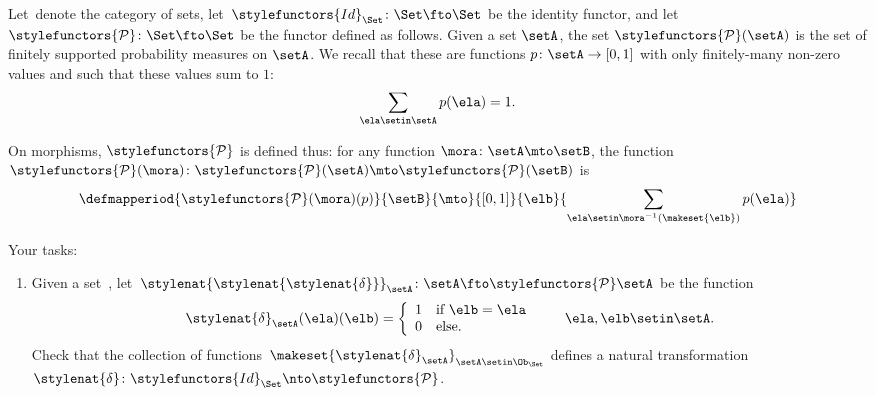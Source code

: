\begin{gradedexercise}
    \label{ex:FinProbMonad}

    Let~\Set denote the category of sets, let~$\stylefunctors{Id}_\Set \colon \Set \fto \Set$ be the identity functor, and let~$\stylefunctors{\mathcal{P}} \colon \Set \fto \Set$ be the functor defined as follows.
    Given a set $\setA$, the set $\stylefunctors{\mathcal{P}}(\setA)$ is the set of finitely supported probability measures on $\setA$.
    We recall that these are functions $p \colon \setA \to [0,1]$ with only finitely-many non-zero values and such that these values sum to $1$:
    \begin{equation}
        \sum_{\ela \setin \setA} p(\ela) = 1.
    \end{equation}

    On morphisms, $\stylefunctors{\mathcal{P}}$ is defined thus: for any function $\mora \colon \setA \mto \setB$, the function $\stylefunctors{\mathcal{P}}(\mora) \colon \stylefunctors{\mathcal{P}}(\setA) \mto \stylefunctors{\mathcal{P}}(\setB)$ is
    \begin{equation}
        \defmapperiod{\stylefunctors{\mathcal{P}}(\mora)(p)}{\setB}{\mto}{[0,1]}{\elb}{\sum_{\ela \setin \mora^{-1}(\makeset{ \elb })} p(\ela)}
    \end{equation}

    Your tasks:
    \begin{enumerate}
        \item
              Given a set~\setA, let~$\stylenat{\stylenat{\stylenat{\delta}}}_{\setA} \colon \setA \fto \stylefunctors{\mathcal{P}} \setA$ be the function
              \begin{equation}
                  \stylenat{\delta}_\setA (\ela)(\elb) = \left\{\begin{array}{ll}
                      1 & \text{if } \elb = \ela \\
                      0 & \text{else.
                      }
                  \end{array}\right.{}
                  \quad \quad \ela, \elb \setin\setA.
              \end{equation}
              Check that the collection of functions~$\makeset{\stylenat{\delta}_{\setA}}_{\setA \setin\Ob_{\Set}}$ defines a natural transformation~$\stylenat{\delta}\colon \stylefunctors{Id}_\Set \nto \stylefunctors{\mathcal{P}}$.


\end{enumerate}
\end{gradedexercise}
